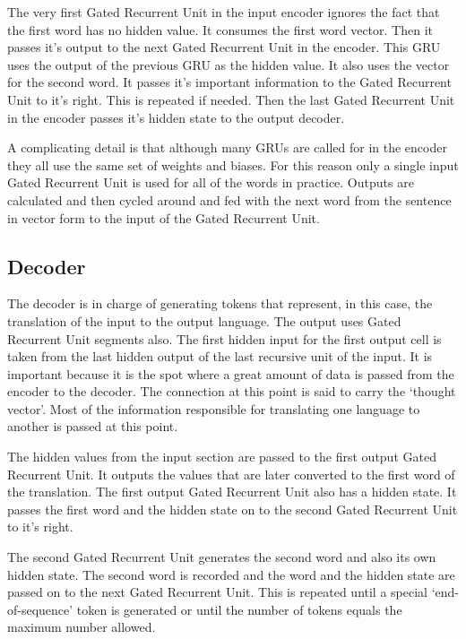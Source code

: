 The very first Gated Recurrent Unit in the input encoder ignores the fact that the first word has no hidden value. It consumes the first word vector. Then it passes it's output to the next Gated Recurrent Unit in the encoder. This GRU uses the output of the previous GRU as the hidden value. It also uses the vector for the second word. It passes it's important information to the Gated Recurrent Unit to it's right. This is repeated if needed. Then the last Gated Recurrent Unit in the encoder passes it's hidden state to the output decoder.

A complicating detail is that although many GRUs are called for in the encoder they all use the same set of weights and biases. For this reason only a single input Gated Recurrent Unit is used for all of the words in practice. Outputs are calculated and then cycled around and fed with the next word from the sentence in vector form to the input of the Gated Recurrent Unit. 

\subsection{Decoder}
The decoder is in charge of generating tokens that represent, in this case, the translation of the input to the output language. The output uses Gated Recurrent Unit segments also. The first hidden input for the first output cell is taken from the last hidden output of the last recursive unit of the input. It is important because it is the spot where a great amount of data is passed from the encoder to the decoder. The connection at this point is said to carry the `thought vector'. Most of the information responsible for translating one language to another is passed at this point.

The hidden values from the input section are passed to the first output Gated Recurrent Unit. It outputs the values that are later converted to the first word of the translation. The first output Gated Recurrent Unit also has a hidden state. It passes the first word and the hidden state on to the second Gated Recurrent Unit to it's right.

The second Gated Recurrent Unit generates the second word and also its own hidden state. The second word is recorded and the word and the hidden state are passed on to the next Gated Recurrent Unit. This is repeated until a special `end-of-sequence' token is generated or until the number of tokens equals the maximum number allowed.

